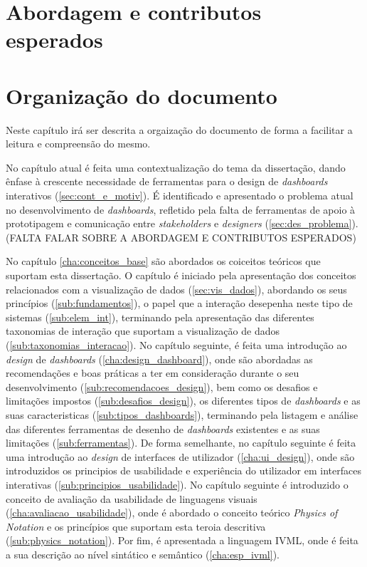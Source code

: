 \section{Abordagem e contributos esperados}
\label{sec:contribuicoes}



\section{Organização do documento}
\label{sec:organizacao}

Neste capítulo irá ser descrita a orgaização do documento de forma a facilitar a leitura e compreensão do mesmo. 

No capítulo atual é feita uma contextualização do tema da dissertação, dando ênfase à crescente necessidade de ferramentas para o design de \textit{dashboards} interativos (\ref{sec:cont_e_motiv}). É identificado e apresentado o problema atual no desenvolvimento de \textit{dashboards}, refletido pela falta de ferramentas de apoio à prototipagem e comunicação entre \textit{stakeholders} e \textit{designers} (\ref{sec:des_problema}). (FALTA FALAR SOBRE A ABORDAGEM E CONTRIBUTOS ESPERADOS) 

No capítulo \ref{cha:conceitos_base} são abordados os coiceitos teóricos que suportam esta dissertação. O capítulo é iniciado pela apresentação dos conceitos relacionados com a visualização de dados (\ref{sec:vis_dados}), abordando os seus princípios (\ref{sub:fundamentos}), o papel que a interação desepenha neste tipo de sistemas (\ref{sub:elem_int}), terminando pela apresentação das diferentes taxonomias de interação que suportam a visualização de dados (\ref{sub:taxonomias_interacao}). No capítulo seguinte, é feita uma introdução ao \textit{design} de \textit{dashboards} (\ref{cha:design_dashboard}), onde são abordadas as recomendações e boas práticas a ter em consideração durante o seu desenvolvimento (\ref{sub:recomendacoes_design}), bem como os desafios e limitações impostos (\ref{sub:desafios_design}), os diferentes tipos de \textit{dashboards} e as suas caracteristicas (\ref{sub:tipos_dashboards}), terminando pela listagem e análise das diferentes ferramentas de desenho de \textit{dashboards} existentes e as suas limitações (\ref{sub:ferramentas}). De forma semelhante, no capítulo seguinte é feita uma introdução ao \textit{design} de interfaces de utilizador (\ref{cha:ui_design}), onde são introduzidos os principios de usabilidade e experiência do utilizador em interfaces interativas (\ref{sub:principios_usabilidade}). No capítulo seguinte é introduzido o conceito de avaliação da usabilidade de linguagens visuais (\ref{cha:avaliacao_usabilidade}), onde é abordado o conceito teórico \textit{Physics of Notation} e os princípios que suportam esta teroia descritiva (\ref{sub:physics_notation}). Por fim, é apresentada a linguagem IVML, onde é feita a sua descrição ao nível sintático e semântico (\ref{cha:esp_ivml}).

